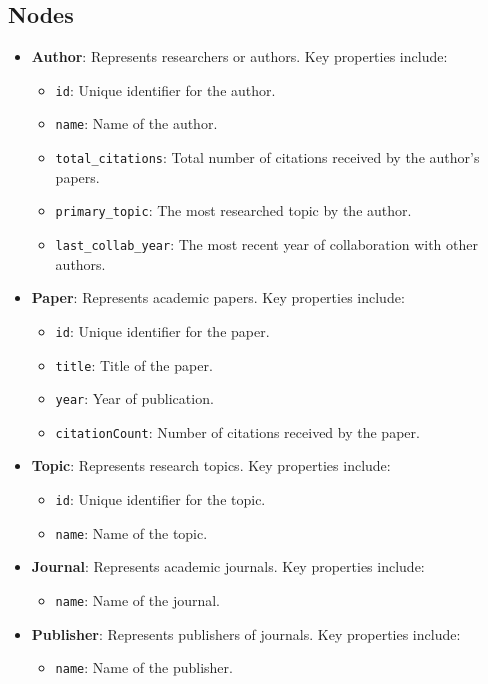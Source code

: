 \documentclass[conference, 12pt]{IEEEtran}
\begin{document}
\subsection{Nodes}
\begin{itemize}
    \item \textbf{Author}: Represents researchers or authors. Key properties include:
    \begin{itemize}
        \item \texttt{id}: Unique identifier for the author.
        \item \texttt{name}: Name of the author.
        \item \texttt{total\_citations}: Total number of citations received by the author's papers.
        \item \texttt{primary\_topic}: The most researched topic by the author.
        \item \texttt{last\_collab\_year}: The most recent year of collaboration with other authors.
    \end{itemize}
    \item \textbf{Paper}: Represents academic papers. Key properties include:
    \begin{itemize}
        \item \texttt{id}: Unique identifier for the paper.
        \item \texttt{title}: Title of the paper.
        \item \texttt{year}: Year of publication.
        \item \texttt{citationCount}: Number of citations received by the paper.
    \end{itemize}
    \item \textbf{Topic}: Represents research topics. Key properties include:
    \begin{itemize}
        \item \texttt{id}: Unique identifier for the topic.
        \item \texttt{name}: Name of the topic.
    \end{itemize}
    \item \textbf{Journal}: Represents academic journals. Key properties include:
    \begin{itemize}
        \item \texttt{name}: Name of the journal.
    \end{itemize}
    \item \textbf{Publisher}: Represents publishers of journals. Key properties include:
    \begin{itemize}
        \item \texttt{name}: Name of the publisher.
    \end{itemize}
\end{itemize}
\end{document}
